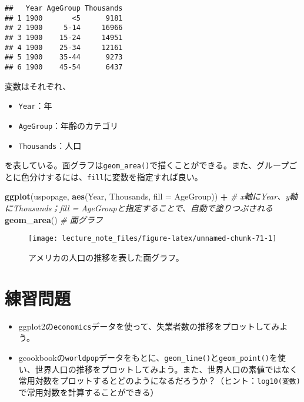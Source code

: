 \documentclass[]{book}
\newenvironment{Shaded}{\begin{snugshade}}{\end{snugshade}}
\newcommand{\KeywordTok}[1]{\textcolor[rgb]{0.13,0.29,0.53}{\textbf{#1}}}
\newcommand{\DataTypeTok}[1]{\textcolor[rgb]{0.13,0.29,0.53}{#1}}
\newcommand{\StringTok}[1]{\textcolor[rgb]{0.31,0.60,0.02}{#1}}
\newcommand{\CommentTok}[1]{\textcolor[rgb]{0.56,0.35,0.01}{\textit{#1}}}
\newcommand{\OperatorTok}[1]{\textcolor[rgb]{0.81,0.36,0.00}{\textbf{#1}}}
\newcommand{\NormalTok}[1]{#1}
\begin{document}
\begin{verbatim}
##   Year AgeGroup Thousands
## 1 1900       <5      9181
## 2 1900     5-14     16966
## 3 1900    15-24     14951
## 4 1900    25-34     12161
## 5 1900    35-44      9273
## 6 1900    45-54      6437
\end{verbatim}

変数はそれぞれ、

\begin{itemize}
\item
  \texttt{Year}：年
\item
  \texttt{AgeGroup}：年齢のカテゴリ
\item
  \texttt{Thousands}：人口
\end{itemize}

を表している。面グラフは\texttt{geom\_area()}で描くことができる。また、グループごとに色分けするには、\texttt{fill}に変数を指定すれば良い。



\begin{Shaded}
\begin{Highlighting}[]
\KeywordTok{ggplot}\NormalTok{(uspopage, }\KeywordTok{aes}\NormalTok{(Year, Thousands, }\DataTypeTok{fill =}\NormalTok{ AgeGroup)) }\OperatorTok{+}\StringTok{ }\CommentTok{# x軸にYear、y軸にThousands；fill = AgeGroupと指定することで、自動で塗りつぶされる}
\StringTok{  }\KeywordTok{geom_area}\NormalTok{() }\CommentTok{# 面グラフ}
\end{Highlighting}
\end{Shaded}

\begin{figure}

{\centering \texttt{[image: lecture\_note\_files/figure-latex/unnamed-chunk-71-1]} 

}

\caption{アメリカの人口の推移を表した面グラフ。}\label{fig:unnamed-chunk-71}
\end{figure}

\section{練習問題}\label{-3}

\begin{itemize}
\item
  ggplot2の\texttt{economics}データを使って、失業者数の推移をプロットしてみよう。
\item
  gcookbookの\texttt{worldpop}データをもとに、\texttt{geom\_line()}と\texttt{geom\_point()}を使い、世界人口の推移をプロットしてみよう。また、世界人口の素値ではなく常用対数をプロットするとどのようになるだろうか？（ヒント：\texttt{log10(変数)}で常用対数を計算することができる）
\end{itemize}
\end{document}
